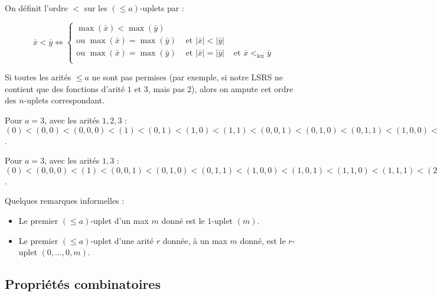 \documentclass{report}
\newcommand{\leqa}{\left( \leqslant a \right)}
\begin{document}
		\begin{definition}
			\label{def:bon_ordre_sur_uplets}
			On définit l'ordre $<$ sur les $\leqa$-uplets par :
			
			\[
				\bar{x} < \bar{y} \Leftrightarrow \left\lbrace
														\begin{array}{ccc}
															\max\left(\bar{x}\right) < \max\left(\bar{y}\right) & & \\
															\text{ou } \max\left(\bar{x}\right) = \max\left(\bar{y}\right) & 
																\text{ et } \left|\bar{x}\right| < \left|\bar{y}\right| & \\
															\text{ou } \max\left(\bar{x}\right) = \max\left(\bar{y}\right) & 
																\text{ et } \left|\bar{x}\right| = \left|\bar{y}\right| & 
																\text{ et } \bar{x} <_{\text{lex}} \bar{y}\\
														\end{array}
													\right. 
			\]

		\end{definition}
				
		Si toutes les arités $\leqslant a$ ne sont pas permises (par exemple, si notre LSRS ne contient que des fonctions d'arité $1$ et $3$, mais pas $2$), alors on ampute cet ordre des $n$-uplets correspondant.
	
		\begin{example}
			Pour $a = 3$, avec les arités $1,2,3$ : $(0) < (0, 0) < (0,0,0) < (1) < (0,1) < (1,0) < (1,1) < (0,0,1) < (0,1,0) < (0,1,1) < (1,0,0) < (1,0,1) < (1,1,0) < (1,1,1) < (2) < (0,2) < \dots$.
			
			Pour $a = 3$, avec les arités $1,3$ : $(0) < (0,0,0) < (1) < (0,0,1) < (0,1,0) < (0,1,1) < (1,0,0) < (1,0,1) < (1,1,0) < (1,1,1) < (2) < (0,0,2) <\dots$.
		\end{example}
		
		\begin{remark}
			Quelques remarques informelles : 
			\begin{itemize}
				\item 	Le premier $\leqa$-uplet d'un max $m$ donné est le $1$-uplet $\left( m \right)$.
				\item 	Le premier $\leqa$-uplet d'une arité $r$ donnée, à un max $m$ donné, est le $r$-uplet $\left( 0, \dots, 0, m\right)$.
			\end{itemize}
		\end{remark}
		
		
		
		\subsection{Propriétés combinatoires}
		\label{subsec:bon_ordre_prop_combinatoires}
		
\end{document}
